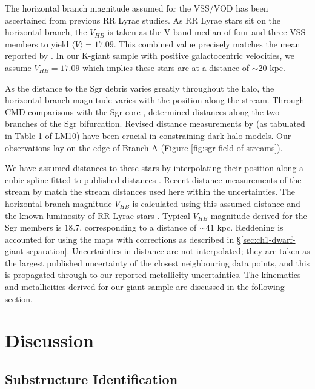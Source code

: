 The horizontal branch magnitude assumed for the VSS/VOD has been ascertained from previous RR Lyrae studies. As RR Lyrae stars sit on the horizontal branch, the $V_{HB}$ is taken as the V-band median of four \citet{Prior;et-al_2009a} and three  \citet{Duffau;et-al_2006} VSS members to yield $\langle{}V\rangle{} = 17.09$. This combined value precisely matches the mean reported by \citet{Duffau;et-al_2006}. In our K-giant sample with positive galactocentric velocities, we assume $V_{HB} = 17.09$ which implies these stars are at a distance of $\sim20$ kpc.

As the distance to the Sgr debris varies greatly throughout the halo, the horizontal branch magnitude varies with the position along the stream. 
Through CMD comparisons with the Sgr core \citep{Bellazzini;et-al_2006}, \citet{Belokurov;et-al_2006} determined distances along the two branches of the Sgr bifurcation.  Revised distance measurements by \citet{Siegel;et-al_2007} (as tabulated in Table 1 of LM10) have been crucial in constraining dark halo models. Our observations lay on the edge of Branch A (Figure \ref{fig:sgr-field-of-streams}).

We have assumed distances to these stars by interpolating their position along a cubic spline fitted to published distances \citep{Siegel;et-al_2007}. Recent distance measurements of the stream by \citet{Ruhland;et-al_2011} match the stream distances used here within the uncertainties. The horizontal branch magnitude $V_{HB}$ is calculated using this assumed distance and the known luminosity of RR Lyrae stars \citep[$M_V = +0.69;$][]{Tsujimoto;et-al_1998}. Typical $V_{HB}$ magnitude derived for the Sgr members is $18.7$, corresponding to a distance of $\sim{}41$ kpc. Reddening is accounted for using the \citet{Schlegel;Finkbeiner;Davis_1998} maps with \citet{Schlafly;Finkbeiner_2011} corrections as described in \S\ref{sec:ch1-dwarf-giant-separation}. Uncertainties in distance are not interpolated; they are taken as the largest published uncertainty of the closest neighbouring data points, and this is propagated through to our reported metallicity uncertainties. The kinematics and metallicities derived for our giant sample are discussed in the following section.


\section{Discussion}
\label{sec:ch1-discussion}
		
	\subsection{Substructure Identification}
	\label{sec:ch1-substructure-identification}
		
